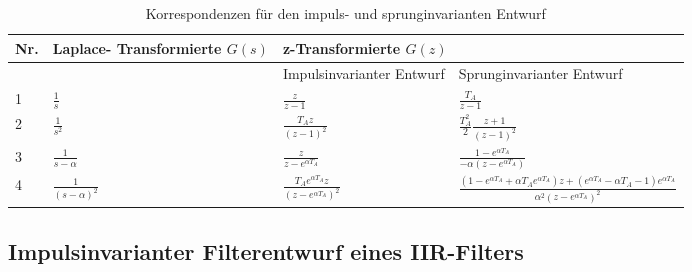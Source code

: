 \begin{table}
  \centering
  \caption{Korrespondenzen für den impuls- und sprunginvarianten Entwurf}
  \begin{tabular}{llll}
    \toprule
    Nr. & 
Laplace- 
Transformierte 
\(G(s)\)
 & \multicolumn{2}{l}{%
z-Transformierte \(G(z)\)} \\
    \midrule
    & & 
Impulsinvarianter 
Entwurf
 & 
Sprunginvarianter 
Entwurf \\
    1 & \(\frac{1}{s}\) & \(\frac{z}{z - 1}\) & \(\frac{T_{A}}{z - 1}\) \\
    2 & \(\frac{1}{s^{2}}\) & \(\frac{T_{A}  z}{(z - 1)^{2}}\) & \(\frac{T_{A}^{2}}{2}  \frac{z + 1}{(z - 1)^{2}}\) \\
    3 & \(\frac{1}{s - \alpha}\) & \(\frac{z}{z - e^{\alpha  T_{A}}}\) & \(\frac{1 - e^{\alpha  T_{A}}}{- \alpha  \left( z - e^{\alpha  T_{A}} \right)}\) \\
    4 & \(\frac{1}{(s - \alpha)^{2}}\) & \(\frac{T_{A}  e^{\alpha  T_{A}}  z}{\left( z - e^{\alpha  T_{A}} \right)^{2}}\) & \(\frac{\left( 1 - e^{\alpha  T_{A}} + \alpha  T_{A}  e^{\alpha  T_{A}} \right)  z + \left( e^{\alpha  T_{A}} - \alpha  T_{A} - 1 \right)  e^{\alpha  T_{A}}}{\alpha^{2}  \left( z - e^{\alpha  T_{A}} \right)^{2}}\) \\
    \bottomrule
  \end{tabular}
\end{table}

\subsection{Impulsinvarianter Filterentwurf eines IIR-Filters}\label{sec:9.1.4}

